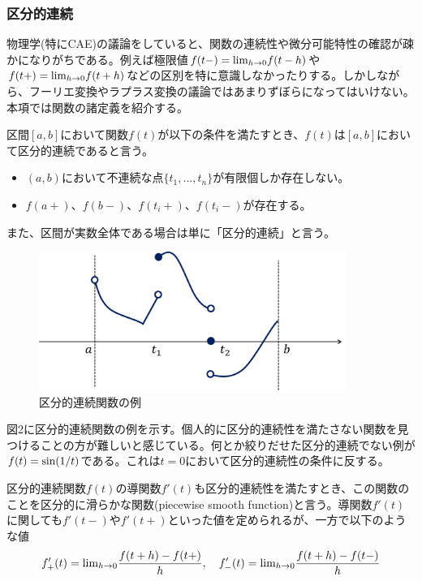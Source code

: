 \documentclass[dvipdfmx, 9pt, a4paper]{jsarticle}
\begin{document}
\subsubsection{区分的連続}
物理学(特にCAE)の議論をしていると、関数の連続性や微分可能特性の確認が疎かになりがちである。例えば極限値$f(t-)={\rm lim}_{h \to 0}f(t-h)$や$f(t+)={\rm lim}_{h \to 0}f(t+h)$などの区別を特に意識しなかったりする。しかしながら、フーリエ変換やラプラス変換の議論ではあまりずぼらになってはいけない。本項では関数の諸定義を紹介する。\par
\begin{tcolorbox}[title=区分的連続関数(piecewise continuous function)]
区間$[a, b]$において関数$f(t)$が以下の条件を満たすとき、$f(t)$は$[a, b]$において区分的連続であると言う。
\begin{itemize}
\item $(a, b)$において不連続な点$\{ t_1, ..., t_n \}$が有限個しか存在しない。
\item $f(a+)$、$f(b-)$、$f(t_i+)$、$f(t_i-)$が存在する。
\end{itemize}
また、区間が実数全体である場合は単に「区分的連続」と言う。
\end{tcolorbox}
\begin{figure}[t]
\begin{center}
\includegraphics[width=10cm]{fig2.png}
\caption{区分的連続関数の例}
\end{center}
\end{figure}
図2に区分的連続関数の例を示す。個人的に区分的連続性を満たさない関数を見つけることの方が難しいと感じている。何とか絞りだせた区分的連続でない例が$f(t)={\rm sin}(1/t)$である。これは$t=0$において区分的連続性の条件に反する。\par
区分的連続関数$f(t)$の導関数$f'(t)$も区分的連続性を満たすとき、この関数のことを区分的に滑らかな関数(piecewise smooth function)と言う。導関数$f'(t)$に関しても$f'(t-)$や$f'(t+)$といった値を定められるが、一方で以下のような値
\begin{equation}
f'_+(t)={\rm lim}_{h \to 0}\frac{f(t+h)-f(t+)}{h},~~~f'_-(t)={\rm lim}_{h \to 0}\frac{f(t+h)-f(t-)}{h} \notag
\end{equation}
\end{document}
